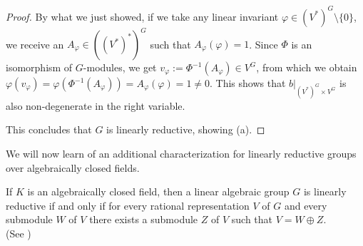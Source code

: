 \begin{proof}
  By what we just showed, if we take any linear invariant $\varphi \in (V^\ast)^G \setminus \{0\}$, we receive an $A_\varphi \in ((V^\ast)^\ast)^G$ such that $A_\varphi(\varphi) = 1$.
  Since $\Phi$ is an isomorphism of \linebreak$G$-modules, we get $v_\varphi := \Phi^{-1}(A_\varphi) \in V^G$, from which we obtain \linebreak $\varphi (v_\varphi) = \varphi (\Phi^{-1}(A_\varphi)) = A_\varphi (\varphi) = 1 \neq 0$.
  This shows that $\left. b\right|_{(V^\ast)^G \times V^G}$ is also non-degenerate in the right variable.
  
  This concludes that $G$ is linearly reductive, showing (a).
\end{proof}

We will now learn of an additional characterization for linearly reductive groups over algebraically closed fields.

\begin{theorem}\label{decomp}
  If $K$ is an algebraically closed field, then a linear algebraic group $G$ is linearly reductive if and only if for every rational representation $V$ of $G$ and every submodule $W$ of $V$ there exists a submodule $Z$ of $V$ such that $V = W \oplus Z$.  \\
  (See \cite[2.2.5]{DK15})
\end{theorem}

